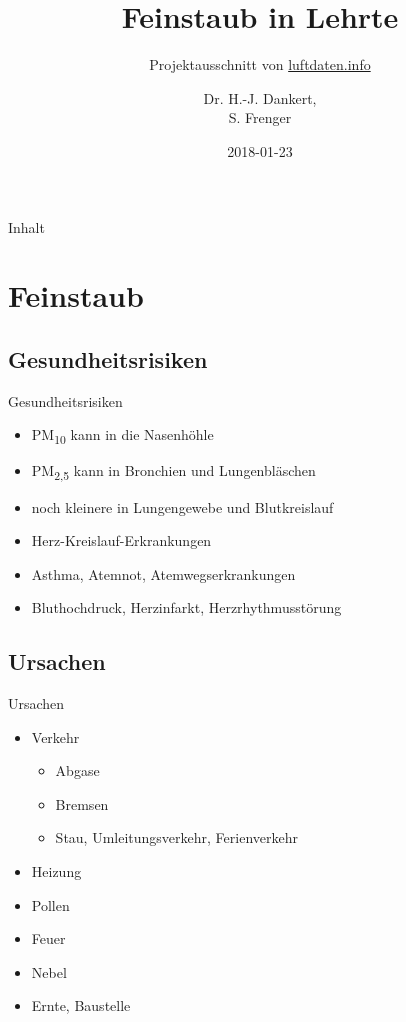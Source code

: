 \documentclass[aspectratio=169]{beamer} %
\begin{document}
\title{Feinstaub in Lehrte}
\subtitle{Projektausschnitt von \href{http://www.luftdaten.info}{luftdaten.info}}
\author{Dr. H.-J. Dankert,\\S. Frenger}
\date{2018-01-23} 

\frame{\titlepage} 

\begin{frame}{Inhalt}
  \begin{multicols}{2}
    \tableofcontents
  \end{multicols}
\end{frame}

\section{Feinstaub}

\subsection{Gesundheitsrisiken}
\begin{frame}{Gesundheitsrisiken}
  \begin{itemize}
  \item PM\textsubscript{10} kann in die Nasenhöhle
  \item PM\textsubscript{2,5} kann in Bronchien und Lungenbläschen 
  \item noch kleinere in Lungengewebe und Blutkreislauf
  \item Herz-Kreislauf-Erkrankungen
  \item Asthma, Atemnot, Atemwegserkrankungen
  \item Bluthochdruck, Herzinfarkt, Herzrhythmusstörung
  \end{itemize}
\end{frame}

\subsection{Ursachen}
\begin{frame}{Ursachen}
  \begin{itemize}
  \item Verkehr
    \begin{itemize}
    \item Abgase
    \item Bremsen
    \item Stau, Umleitungsverkehr, Ferienverkehr
    \end{itemize}
  \item Heizung
  \item Pollen
  \item Feuer
  \item Nebel
  \item Ernte, Baustelle
  \end{itemize}
\end{frame}
\end{document}

